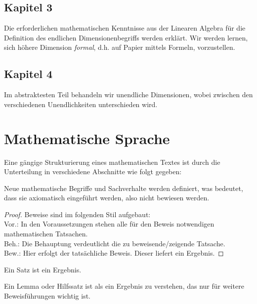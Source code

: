 \subsection*{Kapitel 3}
Die erforderlichen mathematischen Kenntnisse aus der Linearen Algebra für die Definition des endlichen Dimensionenbegriffs werden erklärt. Wir werden lernen, sich höhere Dimension \emph{formal}, d.h. auf Papier mittels Formeln, vorzustellen.
\subsection*{Kapitel 4}
Im abstraktesten Teil behandeln wir unendliche Dimensionen, wobei zwischen den verschiedenen Unendlichkeiten unterschieden wird.
\newpage
\section{Mathematische Sprache}
Eine gängige Strukturierung eines mathematischen Textes ist durch die Unterteilung in verschiedene Abschnitte wie folgt gegeben:

\theoremstyle{definition}
\begin{definition}{}
Neue mathematische Begriffe und Sachverhalte werden definiert, was bedeutet, dass sie axiomatisch eingeführt werden, also nicht bewiesen werden.
\end{definition}

\begin{proof}
Beweise sind im folgenden Stil aufgebaut:
\\ Vor.: In den Voraussetzungen stehen alle für den Beweis notwendigen mathematischen Tatsachen.
\\ Beh.: Die Behauptung verdeutlicht die zu beweisende/zeigende Tatsache.
\\ Bew.: Hier erfolgt der tatsächliche Beweis. Dieser liefert ein Ergebnis.
\end{proof}

\theoremstyle{Satz}
\begin{Satz}{}
Ein Satz ist ein Ergebnis. 
\end{Satz}

\theoremstyle{Lemma}
\begin{Lemma}{}
Ein Lemma oder Hilfssatz ist als ein Ergebnis zu verstehen, das nur für weitere Beweisführungen wichtig ist.
\end{Lemma}

